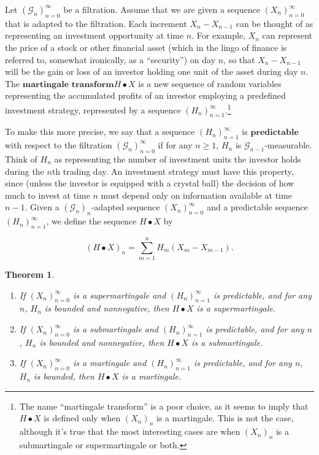 \documentclass[11pt]{report}
\theoremstyle{plain}
\newtheorem{thm}{Theorem}[chapter]
\theoremstyle{definition}
\begin{document}
Let $(\mathcal{G}_n)_{n=0}^\infty$ be a filtration.
Assume that we are given a sequence
$(X_n)_{n=0}^\infty$ that is adapted to the
filtration. Each increment $X_n-X_{n-1}$ can be
thought of as representing an investment opportunity
at time $n$. For example, $X_n$ can represent the
price of a stock or other financial asset (which in
the lingo of finance is referred to, somewhat
ironically, as a ``security'') on day $n$, so that
$X_n-X_{n-1}$ will be the gain or loss of an investor
holding one unit of the asset during day $n$. The
$\textbf{martingale transform}$$H\bullet X$ is a new
sequence of random variables representing the
accumulated profits of an investor employing a
predefined investment strategy, represented by a
sequence
$(H_n)_{n=1}^\infty$.\footnote{The name ``martingale transform'' is a poor choice,
as it seems to imply that $H\bullet X$ is defined
only when $(X_n)_n$ is a martingale. This is not the
case, although it's true that the most interesting
cases are when $(X_n)_n$ is a submartingale or
supermartingale or both.}

To make this more precise, we say that a sequence
$(H_n)_{n=1}^\infty$ is $\textbf{predictable}$ with
respect to the filtration
$(\mathcal{G}_n)_{n=0}^\infty$ if for any $n\ge 1$,
$H_n$ is $\mathcal{G}_{n-1}$-measurable. Think of
$H_n$ as representing the number of investment units
the investor holds during the $n$th trading day. An
investment strategy must have this property, since
(unless the investor is equipped with a crystal ball)
the decision of how much to invest at time $n$ must
depend only on information available at time $n-1$.
Given a $(\mathcal{G}_n)_n$-adapted sequence
$(X_n)_{n=0}^\infty$ and a predictable sequence
$(H_n)_{n=1}^\infty$, we define the sequence
$H\bullet X$ by

\[
(H\bullet X)_n = \sum_{m=1}^n H_m(X_m-X_{m-1}).
\]

\begin{thm}
\label{thm-marting-transform}

\begin{enumerate}[label=\arabic*.]
\item If $(X_n)_{n=0}^\infty$ is a supermartingale and
$(H_n)_{n=1}^\infty$ is predictable, and for any $n$,
$H_n$ is bounded and nonnegative, then $H\bullet X$
is a supermartingale.

\item If $(X_n)_{n=0}^\infty$ is a submartingale and
$(H_n)_{n=1}^\infty$ is predictable, and for any $n$,
$H_n$ is bounded and nonnegative, then $H\bullet X$
is a submartingale.

\item If $(X_n)_{n=0}^\infty$ is a martingale and
$(H_n)_{n=1}^\infty$ is predictable, and for any $n$,
$H_n$ is bounded, then $H\bullet X$ is a martingale.
\end{enumerate}

\end{thm}
\end{document}
